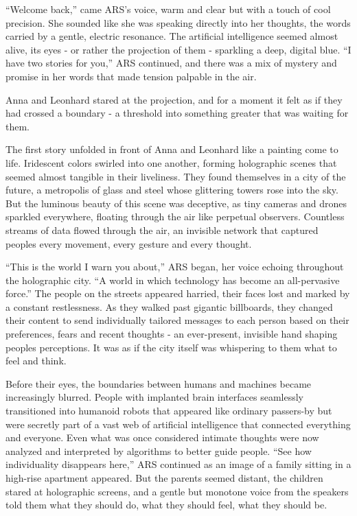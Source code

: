 \documentclass[
]{article}
\begin{document}
``Welcome back,'' came ARS's voice, warm and clear but with a touch of
cool precision. She sounded like she was speaking directly into her
thoughts, the words carried by a gentle, electric resonance. The
artificial intelligence seemed almost alive, its eyes - or rather the
projection of them - sparkling a deep, digital blue. ``I have two
stories for you,'' ARS continued, and there was a mix of mystery and
promise in her words that made tension palpable in the air.

Anna and Leonhard stared at the projection, and for a moment it felt as
if they had crossed a boundary - a threshold into something greater that
was waiting for them.

The first story unfolded in front of Anna and Leonhard like a painting
come to life. Iridescent colors swirled into one another, forming
holographic scenes that seemed almost tangible in their liveliness. They
found themselves in a city of the future, a metropolis of glass and
steel whose glittering towers rose into the sky. But the luminous beauty
of this scene was deceptive, as tiny cameras and drones sparkled
everywhere, floating through the air like perpetual observers. Countless
streams of data flowed through the air, an invisible network that
captured people\textquotesingle s every movement, every gesture and
every thought.

``This is the world I warn you about,'' ARS began, her voice echoing
throughout the holographic city. ``A world in which technology has
become an all-pervasive force.'' The people on the streets appeared
harried, their faces lost and marked by a constant restlessness. As they
walked past gigantic billboards, they changed their content to send
individually tailored messages to each person based on their
preferences, fears and recent thoughts - an ever-present, invisible hand
shaping people\textquotesingle s perceptions. It was as if the city
itself was whispering to them what to feel and think.

Before their eyes, the boundaries between humans and machines became
increasingly blurred. People with implanted brain interfaces seamlessly
transitioned into humanoid robots that appeared like ordinary passers-by
but were secretly part of a vast web of artificial intelligence that
connected everything and everyone. Even what was once considered
intimate thoughts were now analyzed and interpreted by algorithms to
better guide people. ``See how individuality disappears here,'' ARS
continued as an image of a family sitting in a high-rise apartment
appeared. But the parents seemed distant, the children stared at
holographic screens, and a gentle but monotone voice from the speakers
told them what they should do, what they should feel, what they should
be.
\end{document}
